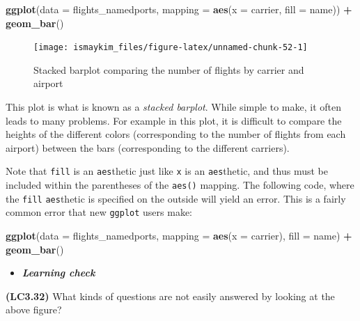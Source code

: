 \documentclass[12pt,]{krantz}
\makeatletter
\newenvironment{Shaded}{\begin{snugshade}}{\end{snugshade}}
\newcommand{\KeywordTok}[1]{\textcolor[rgb]{0.27,0.27,0.27}{\textbf{#1}}}
\newcommand{\DataTypeTok}[1]{\textcolor[rgb]{0.27,0.27,0.27}{#1}}
\newcommand{\StringTok}[1]{\textcolor[rgb]{0.5,0.5,0.5}{#1}}
\newcommand{\OperatorTok}[1]{\textcolor[rgb]{0.43,0.43,0.43}{\textbf{#1}}}
\newcommand{\NormalTok}[1]{#1}
\newenvironment{kframe}{%
\medskip{}
\setlength{\fboxsep}{.8em}
 \def\at@end@of@kframe{}%
 \ifinner\ifhmode%
  \def\at@end@of@kframe{\end{minipage}}%
  \begin{minipage}{\columnwidth}%
 \fi\fi%
 \def\FrameCommand##1{\hskip\@totalleftmargin \hskip-\fboxsep
 \colorbox{shadecolor}{##1}\hskip-\fboxsep
     \hskip-\linewidth \hskip-\@totalleftmargin \hskip\columnwidth}%
 \MakeFramed {\advance\hsize-\width
   \@totalleftmargin\z@ \linewidth\hsize
   \@setminipage}}%
 {\par\unskip\endMakeFramed%
 \at@end@of@kframe}
\renewenvironment{Shaded}{\begin{kframe}}{\end{kframe}}
\newenvironment{rmdblock}[1]
  {\begin{shaded*}
  \begin{itemize}
  \renewcommand{\labelitemi}{
    \raisebox{-.7\height}[0pt][0pt]{
    }
  }
  \item
  }
  {
  \end{itemize}
  \end{shaded*}
  }
\newenvironment{learncheck}
  {\begin{rmdblock}{warning}}
  {\end{rmdblock}}
\theoremstyle{definition}
\theoremstyle{definition}
\theoremstyle{definition}
\theoremstyle{remark}
\makeatother
\begin{document}
\begin{Shaded}
\begin{Highlighting}[]
\KeywordTok{ggplot}\NormalTok{(}\DataTypeTok{data =}\NormalTok{ flights_namedports, }
       \DataTypeTok{mapping =} \KeywordTok{aes}\NormalTok{(}\DataTypeTok{x =}\NormalTok{ carrier, }\DataTypeTok{fill =}\NormalTok{ name)) }\OperatorTok{+}
\StringTok{  }\KeywordTok{geom_bar}\NormalTok{()}
\end{Highlighting}
\end{Shaded}

\begin{figure}

{\centering \texttt{[image: ismaykim\_files/figure-latex/unnamed-chunk-52-1]} 

}

\caption{Stacked barplot comparing the number of flights by carrier and airport}\label{fig:unnamed-chunk-52}
\end{figure}

This plot is what is known as a \emph{stacked barplot}. While simple to
make, it often leads to many problems. For example in this plot, it is
difficult to compare the heights of the different colors (corresponding
to the number of flights from each airport) between the bars
(corresponding to the different carriers).

Note that \texttt{fill} is an \texttt{aes}thetic just like \texttt{x} is
an \texttt{aes}thetic, and thus must be included within the parentheses
of the \texttt{aes()} mapping. The following code, where the
\texttt{fill} \texttt{aes}thetic is specified on the outside will yield
an error. This is a fairly common error that new \texttt{ggplot} users
make:

\begin{Shaded}
\begin{Highlighting}[]
\KeywordTok{ggplot}\NormalTok{(}\DataTypeTok{data =}\NormalTok{ flights_namedports, }
       \DataTypeTok{mapping =} \KeywordTok{aes}\NormalTok{(}\DataTypeTok{x =}\NormalTok{ carrier), }\DataTypeTok{fill =}\NormalTok{ name) }\OperatorTok{+}
\StringTok{  }\KeywordTok{geom_bar}\NormalTok{()}
\end{Highlighting}
\end{Shaded}

\begin{learncheck}
\textbf{\emph{Learning check}}
\end{learncheck}

\textbf{(LC3.32)} What kinds of questions are not easily answered by
looking at the above figure?
\end{document}
